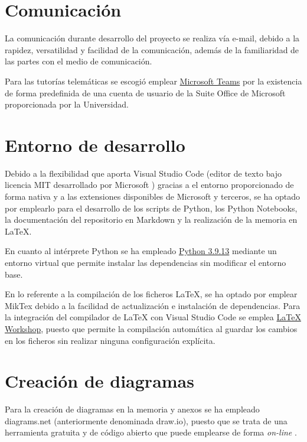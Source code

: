 \section{Comunicación}
La comunicación durante desarrollo del proyecto se realiza vía e-mail, debido a la rapidez,
versatilidad y facilidad de la comunicación, además de la familiaridad de las partes con el 
medio de comunicación.

Para las tutorías telemáticas se escogió emplear 
\href{https://www.microsoft.com/es-es/microsoft-teams/log-in}{Microsoft Teams} por la existencia 
de forma predefinida de una cuenta de usuario de la Suite Office de Microsoft proporcionada
por la Universidad.

\section{Entorno de desarrollo}
Debido a la flexibilidad que aporta Visual Studio Code (editor de texto bajo licencia MIT desarrollado por Microsoft \cite{enwiki:vscode2023})
gracias a el entorno proporcionado de forma nativa y a las extensiones disponibles de Microsoft y terceros, se ha optado
por emplearlo para el desarrollo de los scripts de Python, los Python Notebooks, la documentación del repositorio
en Markdown y la realización de la memoria en LaTeX. 

En cuanto al intérprete Python se ha empleado \href{https://www.python.org/downloads/release/python-3913/}{Python 3.9.13} mediante un entorno virtual que permite instalar
las dependencias sin modificar el entorno base.

En lo referente a la compilación de los ficheros LaTeX, se ha optado por emplear 
MikTex debido a la facilidad de actualización e instalación de dependencias.
Para la integración del compilador de LaTeX con Visual Studio Code se emplea 
\href{https://marketplace.visualstudio.com/items?itemName=James-Yu.latex-workshop}{LaTeX Workshop}, 
puesto que permite la compilación automática al guardar los cambios en los ficheros sin realizar
ninguna configuración explícita.

\section{Creación de diagramas}
Para la creación de diagramas en la memoria y anexos se ha empleado diagrams.net (anteriormente 
denominada draw.io), puesto que se trata de una herramienta gratuita y de código abierto que 
puede emplearse de forma \textit{on-line} \cite{misc:wikipediaDiagrams}. 

